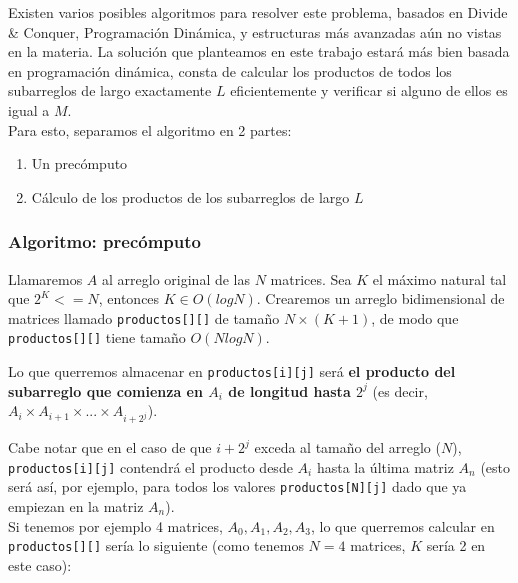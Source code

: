 Existen varios posibles algoritmos para resolver este problema, basados en Divide \& Conquer, 
Programación Dinámica, y estructuras más avanzadas aún no vistas en la materia. La solución que 
planteamos en este trabajo estará más bien basada en programación dinámica, consta de calcular 
los productos de 
todos los subarreglos de largo exactamente $L$ eficientemente y verificar si alguno de ellos 
es igual a $M$. \\

Para esto, separamos el algoritmo en 2 partes:
\begin{enumerate}
\item Un precómputo 
\item Cálculo de los productos de los subarreglos de largo $L$
\end{enumerate}

\subsubsection{Algoritmo: precómputo}

Llamaremos $A$ al arreglo original de las $N$ matrices. 
Sea $K$ el máximo natural tal que $2^K <= N$, entonces $K \in O(log N)$. Crearemos un arreglo 
bidimensional de matrices llamado \texttt{productos[][]} de tamaño $N \times (K+1)$, de modo que 
\texttt{productos[][]} tiene tamaño $O(N log N)$. 

Lo que querremos almacenar en \texttt{productos[i][j]} será \textbf{el producto del subarreglo que 
comienza en $A_i$ de longitud hasta $2^j$} (es decir, $A_i \times A_{i+1} \times ... \times A_{i+2^j}$). 

Cabe notar que en el caso de que $i+2^j$ exceda al tamaño del arreglo ($N$), 
\texttt{productos[i][j]} contendrá el producto desde $A_i$ hasta 
la última matriz $A_n$ (esto será así, por ejemplo, para todos los valores \texttt{productos[N][j]} dado 
que ya empiezan en la matriz $A_n$). \\

Si tenemos por ejemplo 4 matrices, $A_0, A_1, A_2, A_3$, lo que 
querremos calcular en \texttt{productos[][]} sería lo siguiente (como tenemos $N=4$ 
matrices, $K$ sería 2 en este caso):\\

